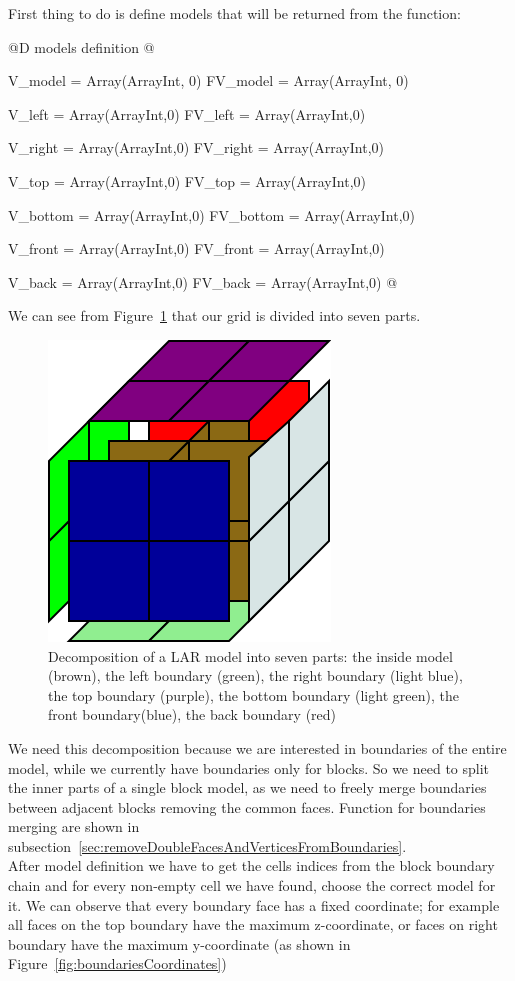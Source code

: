 \documentclass[11pt,oneside]{article}	%
\begin{document}
First thing to do is define models that will be returned from the function:

@D models definition
@{V_model = Array(Array{Int}, 0)
FV_model = Array(Array{Int}, 0)

V_left = Array(Array{Int},0)
FV_left = Array(Array{Int},0)

V_right = Array(Array{Int},0)
FV_right = Array(Array{Int},0)

V_top = Array(Array{Int},0)
FV_top = Array(Array{Int},0)

V_bottom = Array(Array{Int},0)
FV_bottom = Array(Array{Int},0)

V_front = Array(Array{Int},0)
FV_front = Array(Array{Int},0)

V_back = Array(Array{Int},0)
FV_back = Array(Array{Int},0) @}

We can see from Figure~\ref{fig:boundaries} that our grid is divided into seven parts.

\begin{figure}[htb] %
   \centering
   \includegraphics[width=0.25\linewidth]{images/boundaries.png}
   \caption{Decomposition of a LAR model into seven parts: the inside model (brown), the left boundary (green), the right boundary (light blue), the top boundary (purple), the bottom boundary (light green), the front boundary(blue), the back boundary (red)}
   \label{fig:boundaries}
\end{figure}

We need this decomposition because we are interested in boundaries of the entire model, while we currently have boundaries only for blocks. So we need to split the inner parts of a single block model, as we need to freely merge boundaries between adjacent blocks removing the common faces. Function for boundaries merging are shown in subsection~\ref{sec:removeDoubleFacesAndVerticesFromBoundaries}.\\

After model definition we have to get the cells indices from the block boundary chain and for every non-empty cell we have found, choose the correct model for it. We can observe that every boundary face has a fixed coordinate; for example all faces on the top boundary have the maximum z-coordinate, or faces on right boundary have the maximum y-coordinate (as shown in Figure~\ref{fig:boundariesCoordinates})
\end{document}
